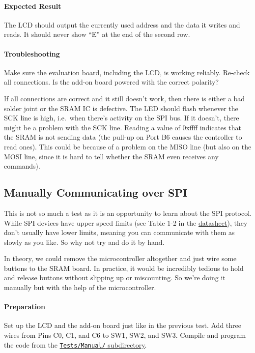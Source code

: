 \documentclass{article}
\newcommand{\datasheet}{\href{https://ww1.microchip.com/downloads/aemDocuments/documents/MPD/ProductDocuments/DataSheets/23A102423LC1024-1-Mbit-SPI-Serial-SRAM-with-SDI-SQI-Interface-20005142.pdf}{datasheet}}
\newcommand{\file}[1]{\texttt{#1}}
\begin{document}
\paragraph{Expected Result}
The LCD should output the currently used address and the data it writes and reads. It should never show ``E'' at the end of the second row. 

\paragraph{Troubleshooting}
Make sure the evaluation board, including the LCD, is working reliably. Re-check all connections. Is the add-on board powered with the correct polarity? 

If all connections are correct and it still doesn't work, then there is either a bad solder joint or the SRAM IC is defective. The LED should flash whenever the SCK line is high, i.e.\ when there's activity on the SPI bus. If it doesn't, there might be a problem with the SCK line. Reading a value of 0xffff indicates that the SRAM is not sending data (the pull-up on Port B6 causes the controller to read ones). This could be because of a problem on the MISO line (but also on the MOSI line, since it is hard to tell whether the SRAM even receives any commands). 

\subsection{Manually Communicating over SPI}
This is not so much a test as it is an opportunity to learn about the SPI protocol. While SPI devices have upper speed limits (see Table 1-2 in the \datasheet), they don't usually have lower limits, meaning you can communicate with them as slowly as you like. So why not try and do it by hand. 

In theory, we could remove the microcontroller altogether and just wire some buttons to the SRAM board. In practice, it would be incredibly tedious to hold and release buttons without slipping up or miscounting. So we're doing it manually but with the help of the microcontroller. 

\paragraph{Preparation}
Set up the LCD and the add-on board just like in the previous test. Add three wires from Pins C0, C1, and C6 to SW1, SW2, and SW3. Compile and program the code from the \href{../Tests/Manual/}{\file{Tests/Manual/} subdirectory}. 
\end{document}

